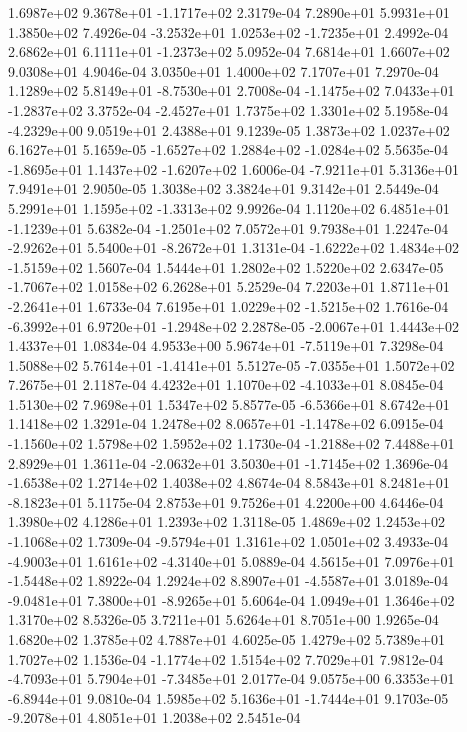  1.6987e+02  9.3678e+01 -1.1717e+02  2.3179e-04
7.2890e+01 5.9931e+01 1.3850e+02  7.4926e-04
-3.2532e+01  1.0253e+02 -1.7235e+01  2.4992e-04
 2.6862e+01  6.1111e+01 -1.2373e+02  5.0952e-04
7.6814e+01 1.6607e+02 9.0308e+01  4.9046e-04
3.0350e+01 1.4000e+02 7.1707e+01  7.2970e-04
 1.1289e+02  5.8149e+01 -8.7530e+01  2.7008e-04
-1.1475e+02  7.0433e+01 -1.2837e+02  3.3752e-04
-2.4527e+01  1.7375e+02  1.3301e+02  5.1958e-04
-4.2329e+00  9.0519e+01  2.4388e+01  9.1239e-05
1.3873e+02 1.0237e+02 6.1627e+01  5.1659e-05
-1.6527e+02  1.2884e+02 -1.0284e+02  5.5635e-04
-1.8695e+01  1.1437e+02 -1.6207e+02  1.6006e-04
-7.9211e+01  5.3136e+01  7.9491e+01  2.9050e-05
1.3038e+02 3.3824e+01 9.3142e+01  2.5449e-04
 5.2991e+01  1.1595e+02 -1.3313e+02  9.9926e-04
 1.1120e+02  6.4851e+01 -1.1239e+01  5.6382e-04
-1.2501e+02  7.0572e+01  9.7938e+01  1.2247e-04
-2.9262e+01  5.5400e+01 -8.2672e+01  1.3131e-04
-1.6222e+02  1.4834e+02 -1.5159e+02  1.5607e-04
1.5444e+01 1.2802e+02 1.5220e+02  2.6347e-05
-1.7067e+02  1.0158e+02  6.2628e+01  5.2529e-04
 7.2203e+01  1.8711e+01 -2.2641e+01  1.6733e-04
 7.6195e+01  1.0229e+02 -1.5215e+02  1.7616e-04
-6.3992e+01  6.9720e+01 -1.2948e+02  2.2878e-05
-2.0067e+01  1.4443e+02  1.4337e+01  1.0834e-04
 4.9533e+00  5.9674e+01 -7.5119e+01  7.3298e-04
 1.5088e+02  5.7614e+01 -1.4141e+01  5.5127e-05
-7.0355e+01  1.5072e+02  7.2675e+01  2.1187e-04
 4.4232e+01  1.1070e+02 -4.1033e+01  8.0845e-04
1.5130e+02 7.9698e+01 1.5347e+02  5.8577e-05
-6.5366e+01  8.6742e+01  1.1418e+02  1.3291e-04
 1.2478e+02  8.0657e+01 -1.1478e+02  6.0915e-04
-1.1560e+02  1.5798e+02  1.5952e+02  1.1730e-04
-1.2188e+02  7.4488e+01  2.8929e+01  1.3611e-04
-2.0632e+01  3.5030e+01 -1.7145e+02  1.3696e-04
-1.6538e+02  1.2714e+02  1.4038e+02  4.8674e-04
 8.5843e+01  8.2481e+01 -8.1823e+01  5.1175e-04
2.8753e+01 9.7526e+01 4.2200e+00  4.6446e-04
1.3980e+02 4.1286e+01 1.2393e+02  1.3118e-05
 1.4869e+02  1.2453e+02 -1.1068e+02  1.7309e-04
-9.5794e+01  1.3161e+02  1.0501e+02  3.4933e-04
-4.9003e+01  1.6161e+02 -4.3140e+01  5.0889e-04
 4.5615e+01  7.0976e+01 -1.5448e+02  1.8922e-04
 1.2924e+02  8.8907e+01 -4.5587e+01  3.0189e-04
-9.0481e+01  7.3800e+01 -8.9265e+01  5.6064e-04
1.0949e+01 1.3646e+02 1.3170e+02  8.5326e-05
3.7211e+01 5.6264e+01 8.7051e+00  1.9265e-04
1.6820e+02 1.3785e+02 4.7887e+01  4.6025e-05
1.4279e+02 5.7389e+01 1.7027e+02  1.1536e-04
-1.1774e+02  1.5154e+02  7.7029e+01  7.9812e-04
-4.7093e+01  5.7904e+01 -7.3485e+01  2.0177e-04
 9.0575e+00  6.3353e+01 -6.8944e+01  9.0810e-04
 1.5985e+02  5.1636e+01 -1.7444e+01  9.1703e-05
-9.2078e+01  4.8051e+01  1.2038e+02  2.5451e-04
